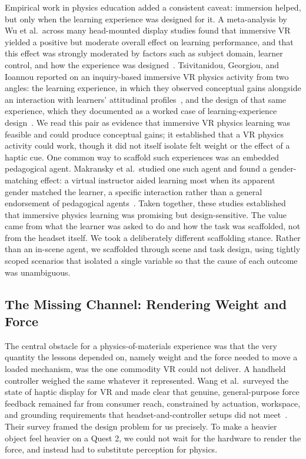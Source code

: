 Empirical work in physics education added a consistent caveat: immersion helped,
but only when the learning experience was designed for it. A meta-analysis by Wu
et al.\ across many head-mounted display studies found that immersive VR yielded a
positive but moderate overall effect on learning performance, and that this effect
was strongly moderated by factors such as subject domain, learner control, and how
the experience was designed~\cite{wu2020effectiveness}. Tsivitanidou, Georgiou, and
Ioannou reported on an inquiry-based immersive VR physics activity from two angles:
the learning experience, in which they observed conceptual gains alongside an
interaction with learners' attitudinal profiles~\cite{tsivitanidou2021inquiry}, and
the design of that same experience, which they documented as a worked case of
learning-experience design~\cite{georgiou2021led}. We read this pair as evidence
that immersive VR physics learning was feasible and could produce conceptual gains;
it established that a VR physics activity could work, though it did not itself
isolate felt weight or the effect of a haptic cue. One common way to scaffold such
experiences was an embedded pedagogical agent. Makransky et al.\ studied one such
agent and found a gender-matching effect: a virtual instructor aided learning most
when its apparent gender matched the learner, a specific interaction rather than a
general endorsement of pedagogical agents~\cite{makransky2019gender}. Taken
together, these studies established that immersive physics learning was promising
but design-sensitive. The value came from what the learner was asked to do and how
the task was scaffolded, not from the headset itself. We took a deliberately
different scaffolding stance. Rather than an in-scene agent, we scaffolded through
scene and task design, using tightly scoped scenarios that isolated a single
variable so that the cause of each outcome was unambiguous.

\subsection{The Missing Channel: Rendering Weight and Force}
The central obstacle for a physics-of-materials experience was that the very
quantity the lessons depended on, namely weight and the force needed to move a
loaded mechanism, was the one commodity VR could not deliver. A handheld controller
weighed the same whatever it represented. Wang et al.\ surveyed the state of haptic
display for VR and made clear that genuine, general-purpose force feedback remained
far from consumer reach, constrained by actuation, workspace, and grounding
requirements that headset-and-controller setups did not
meet~\cite{wang2019haptic}. Their survey framed the design problem for us
precisely. To make a heavier object feel heavier on a Quest 2, we could not wait
for the hardware to render the force, and instead had to substitute perception for
physics.

